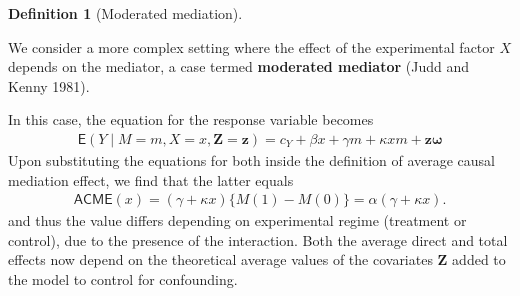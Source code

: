 \documentclass[
  11pt,
  letterpaper,
]{scrbook}
\theoremstyle{definition}
\newtheorem{definition}{Definition}[chapter]
\theoremstyle{definition}
\theoremstyle{remark}
\begin{document}
\begin{definition}[Moderated
mediation]\protect\hypertarget{def-moderated-mediation}{}\label{def-moderated-mediation}

We consider a more complex setting where the effect of the experimental
factor \(X\) depends on the mediator, a case termed \textbf{moderated
mediator} (Judd and Kenny 1981).

In this case, the equation for the response variable becomes
\begin{align*}
\mathsf{E}(Y \mid M=m, X=x, \boldsymbol{Z} = \boldsymbol{z}) = c_Y + \beta x + \gamma m + \kappa x m + \boldsymbol{z}\boldsymbol{\omega}
\end{align*} Upon substituting the equations for both inside the
definition of average causal mediation effect, we find that the latter
equals \begin{align*}
\mathsf{ACME}(x) = (\gamma + \kappa x)\{M(1)-M(0)\} = \alpha (\gamma + \kappa x).
\end{align*} and thus the value differs depending on experimental regime
(treatment or control), due to the presence of the interaction. Both the
average direct and total effects now depend on the theoretical average
values of the covariates \(\boldsymbol{Z}\) added to the model to
control for confounding.

\end{definition}
\end{document}
